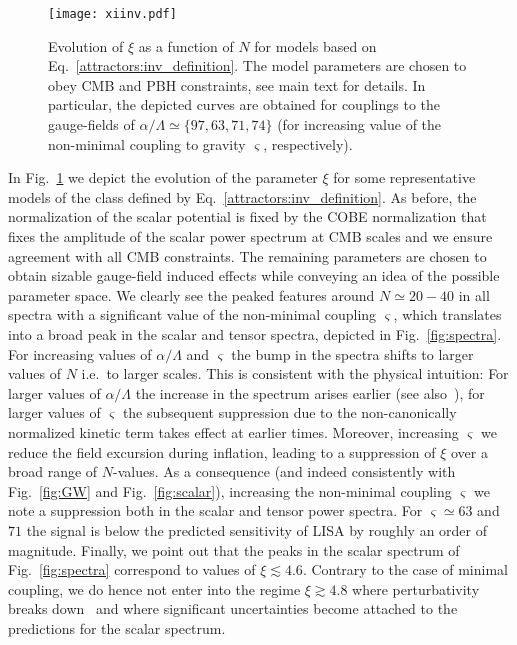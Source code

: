 \begin{figure}[t]
%
\centering
\texttt{[image: xiinv.pdf]}

\caption{Evolution of $\xi$ as a function of $N$ for models based on Eq.~\eqref{attractors:inv_definition}. The model parameters are chosen to obey CMB and PBH constraints, see main text for details. In particular,  the depicted curves are obtained for couplings to the gauge-fields of $\alpha/\Lambda \simeq \{ 97, 63, 71, 74 \}$ (for increasing value of the non-minimal coupling to gravity $\varsigma$, respectively).}
\label{fig:xi_inv}
%
\end{figure}

In Fig.~\ref{fig:xi_inv} we depict the evolution of the parameter $\xi$  for some representative models of the class defined by Eq.~\eqref{attractors:inv_definition}. As before, the normalization of the scalar potential is fixed by the COBE normalization that fixes the amplitude of the scalar power spectrum at CMB scales and we ensure agreement with all CMB constraints. The remaining parameters are chosen to obtain sizable gauge-field induced effects while conveying an idea of the possible parameter space. 
 We clearly see the peaked features around $N \simeq 20 - 40$ in all spectra with a significant value of the non-minimal coupling $\varsigma$, which translates into a broad peak in the scalar and tensor spectra, depicted in Fig.~\ref{fig:spectra}.
For increasing values of $\alpha/\Lambda$ and $\varsigma$ the bump in the spectra shifts to larger values of $N$ i.e.\ to larger scales. This is consistent with the physical intuition: For larger values of $\alpha/\Lambda$ the increase in the spectrum arises earlier (see also~\cite{Domcke:2016bkh}), for larger values of $\varsigma$ the subsequent suppression due to the non-canonically normalized kinetic term takes effect at earlier times.
Moreover, increasing $\varsigma$ we reduce the field excursion during inflation, leading to a suppression of $\xi$ over a broad range of $N$-values. As a consequence (and indeed consistently with Fig.~\ref{fig:GW} and Fig.~\ref{fig:scalar}), increasing the non-minimal coupling $\varsigma$ we note a suppression both in the scalar and tensor power spectra. For $\varsigma \simeq 63$ and $71$ the signal is below the predicted sensitivity of LISA by roughly an order of magnitude. Finally, we point out that the peaks in the scalar spectrum of Fig.~\ref{fig:spectra} correspond to values of $\xi \lesssim 4.6$. Contrary to the case of minimal coupling, we do hence not enter into the regime $\xi \gtrsim 4.8$ where perturbativity breaks down~\cite{Peloso:2016gqs} and where significant uncertainties become attached to the predictions for the scalar spectrum.


